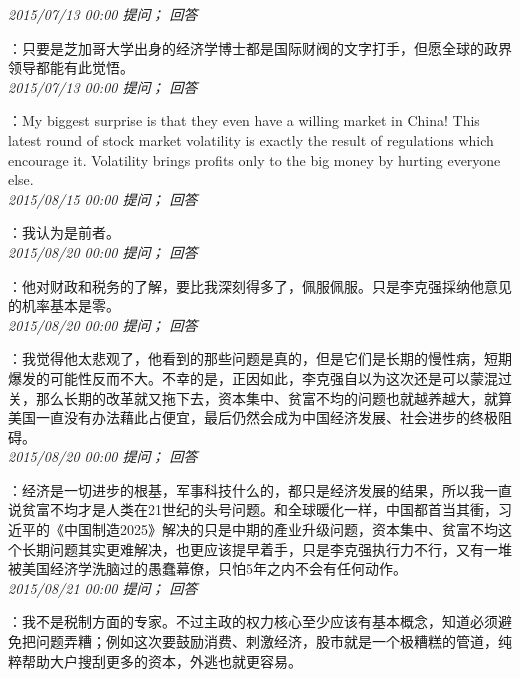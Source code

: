 \documentclass[twocolumn]{ctexart}
\begin{document}
\textit{\hfill\noindent\small 2015/07/13 00:00 提问； 回答}

：只要是芝加哥大学出身的经济学博士都是国际财阀的文字打手，但愿全球的政界领导都能有此觉悟。\\

\textit{\hfill\noindent\small 2015/07/13 00:00 提问； 回答}

：My biggest surprise is that they even have a willing market in China! This latest round of stock market volatility is exactly the result of regulations which encourage it. Volatility brings profits only to the big money by hurting everyone else.\\

\textit{\hfill\noindent\small 2015/08/15 00:00 提问； 回答}

：我认为是前者。\\

\textit{\hfill\noindent\small 2015/08/20 00:00 提问； 回答}

：他对财政和税务的了解，要比我深刻得多了，佩服佩服。只是李克强採纳他意见的机率基本是零。\\

\textit{\hfill\noindent\small 2015/08/20 00:00 提问； 回答}

：我觉得他太悲观了，他看到的那些问题是真的，但是它们是长期的慢性病，短期爆发的可能性反而不大。不幸的是，正因如此，李克强自以为这次还是可以蒙混过关，那么长期的改革就又拖下去，资本集中、贫富不均的问题也就越养越大，就算美国一直没有办法藉此占便宜，最后仍然会成为中国经济发展、社会进步的终极阻碍。\\

\textit{\hfill\noindent\small 2015/08/20 00:00 提问； 回答}

：经济是一切进步的根基，军事科技什么的，都只是经济发展的结果，所以我一直说贫富不均才是人类在21世纪的头号问题。和全球暖化一样，中国都首当其衝，习近平的《中国制造2025》解决的只是中期的產业升级问题，资本集中、贫富不均这个长期问题其实更难解决，也更应该提早着手，只是李克强执行力不行，又有一堆被美国经济学洗脑过的愚蠢幕僚，只怕5年之内不会有任何动作。\\

\textit{\hfill\noindent\small 2015/08/21 00:00 提问； 回答}

：我不是税制方面的专家。不过主政的权力核心至少应该有基本概念，知道必须避免把问题弄糟；例如这次要鼓励消费、刺激经济，股市就是一个极糟糕的管道，纯粹帮助大户搜刮更多的资本，外逃也就更容易。\\
\end{document}
